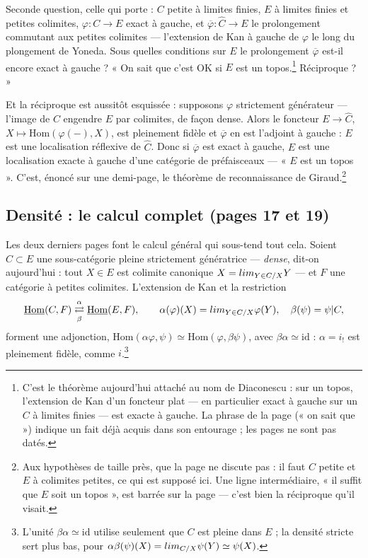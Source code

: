 \documentclass[11pt,a4paper]{article}
\begin{document}
Seconde question, celle qui porte : $C$ petite à limites finies, $E$ à
limites finies et petites colimites, $\varphi : C \to E$ exact à gauche,
et $\overline{\varphi} : \widehat{C} \to E$ le prolongement commutant aux
petites colimites — l'extension de Kan à gauche de $\varphi$ le long du
plongement de Yoneda. Sous quelles conditions sur $E$ le prolongement
$\overline{\varphi}$ est-il encore exact à gauche ? « On sait que c'est OK
si $E$ est un topos.\footnote{C'est le théorème aujourd'hui attaché au nom
de Diaconescu : sur un topos, l'extension de Kan d'un foncteur plat — en
particulier exact à gauche sur un $C$ à limites finies — est exacte à
gauche. La phrase de la page (« on sait que ») indique un fait déjà acquis
dans son entourage ; les pages ne sont pas datés.} Réciproque ? »

Et la réciproque est aussitôt esquissée : supposons $\varphi$ strictement
générateur — l'image de $C$ engendre $E$ par colimites, de façon dense.
Alors le foncteur $E \to \widehat{C}$, $X \mapsto \mathrm{Hom}(\varphi(-), X)$,
est pleinement fidèle et $\overline{\varphi}$ en est l'adjoint à gauche :
$E$ est une localisation réflexive de $\widehat{C}$. Donc si
$\overline{\varphi}$ est exact à gauche, $E$ est une localisation exacte à
gauche d'une catégorie de préfaisceaux — « $E$ est un topos ». C'est,
énoncé sur une demi-page, le théorème de reconnaissance de
Giraud.\footnote{Aux hypothèses de taille près, que la page ne discute
pas : il faut $C$ petite et $E$ à colimites petites, ce qui est supposé
ici. Une ligne intermédiaire, « il suffit que $E$ soit un topos », est
barrée sur la page — c'est bien la réciproque qu'il visait.}

\subsection*{Densité : le calcul complet (pages 17 et 19)}

Les deux derniers pages font le calcul général qui sous-tend tout cela.
Soient $C \subset E$ une sous-catégorie pleine strictement génératrice
— \emph{dense}, dit-on aujourd'hui : tout $X \in E$ est colimite canonique
$X = \varinjlim_{Y \in C/X} Y$ — et $F$ une catégorie à petites colimites.
L'extension de Kan et la restriction
\[
\underline{\mathrm{Hom}}(C, F)
\underset{\beta}{\overset{\alpha}{\rightleftarrows}}
\underline{\mathrm{Hom}}(E, F),
\qquad
\alpha(\varphi)(X) = \varinjlim_{Y \in C/X} \varphi(Y), \quad
\beta(\psi) = \psi|C,
\]
forment une adjonction, $\mathrm{Hom}(\alpha\varphi, \psi) \simeq
\mathrm{Hom}(\varphi, \beta\psi)$, avec $\beta\alpha \simeq \mathrm{id}$ :
$\alpha = i_!$ est pleinement fidèle, comme $i$.\footnote{L'unité
$\beta\alpha \simeq \mathrm{id}$ utilise seulement que $C$ est pleine dans
$E$ ; la densité stricte sert plus bas, pour
$\alpha\beta(\psi)(X) = \varinjlim_{C/X} \psi(Y) \simeq \psi(X)$.}
\end{document}
